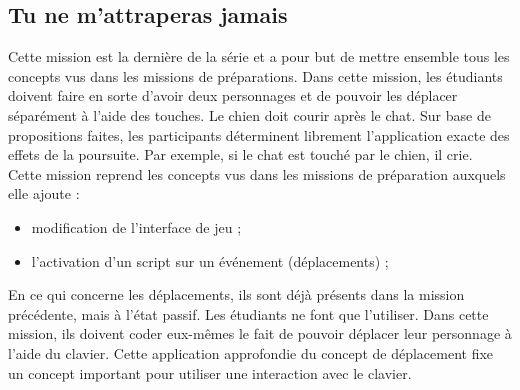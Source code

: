 \subsection{Tu ne m'attraperas jamais}
\label{chien-chat}
Cette \gls{mission} est la dernière de la série et a pour but de mettre ensemble tous les concepts vus dans les \glspl{mission} de préparations. Dans cette \gls{mission}, les étudiants doivent faire en sorte d'avoir deux personnages et de pouvoir les déplacer séparément à l'aide des touches. Le chien doit courir après le chat. Sur base de propositions faites, les participants déterminent librement l'application exacte des effets de la poursuite. Par exemple, si le chat est touché par le chien, il crie.\\

Cette \gls{mission} reprend les concepts vus dans les \glspl{mission} de préparation auxquels elle ajoute :
\begin{itemize}
\item modification de l'interface de jeu ;
\item l'activation d'un \gls{script} sur un événement (déplacements) ;
\end{itemize}

En ce qui concerne les déplacements, ils sont déjà présents dans la \gls{mission} précédente, mais à l'état passif. Les étudiants ne font que l'utiliser. Dans cette \gls{mission}, ils doivent coder eux-mêmes le fait de pouvoir déplacer leur personnage à l'aide du clavier. Cette application approfondie du concept de déplacement fixe un concept important pour utiliser une interaction avec le clavier.

